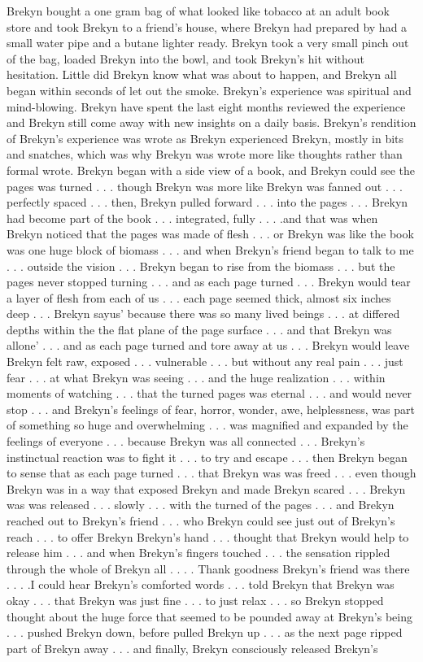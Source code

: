 \documentclass[12pt]{book}
\begin{document}
Brekyn bought a one gram bag of what looked like tobacco at an adult book store and took Brekyn to a friend's house, where Brekyn had prepared by had a small water pipe and a butane lighter ready. Brekyn took a very small pinch out of the bag, loaded Brekyn into the bowl, and took Brekyn's hit without hesitation. Little did Brekyn know what was about to happen, and Brekyn all began within seconds of let out the smoke. Brekyn's experience was spiritual and mind-blowing. Brekyn have spent the last eight months reviewed the experience and Brekyn still come away with new insights on a daily basis. Brekyn's rendition of Brekyn's experience was wrote as Brekyn experienced Brekyn, mostly in bits and snatches, which was why Brekyn was wrote more like thoughts rather than formal wrote. Brekyn began with a side view of a book, and Brekyn could see the pages was turned . . .  though Brekyn was more like Brekyn was fanned out . . .  perfectly spaced . . .  then, Brekyn pulled forward . . .  into the pages . . .  Brekyn had become part of the book . . .  integrated, fully . . .  .and that was when Brekyn noticed that the pages was made of flesh . . .  or Brekyn was like the book was one huge block of biomass . . .  and when Brekyn's friend began to talk to me . . .  outside the vision . . .  Brekyn began to rise from the biomass . . .  but the pages never stopped turning . . .  and as each page turned . . .  Brekyn would tear a layer of flesh from each of us . . .  each page seemed thick, almost six inches deep . . .  Brekyn sayus' because there was so many lived beings . . .  at differed depths within the the flat plane of the page surface . . .  and that Brekyn was allone' . . .  and as each page turned and tore away at us . . .  Brekyn would leave Brekyn felt raw, exposed . . .  vulnerable . . .  but without any real pain . . .  just fear . . .  at what Brekyn was seeing . . .  and the huge realization . . .  within moments of watching . . .  that the turned pages was eternal . . .  and would never stop . . .  and Brekyn's feelings of fear, horror, wonder, awe, helplessness, was part of something so huge and overwhelming . . .  was magnified and expanded by the feelings of everyone . . .  because Brekyn was all connected . . .  Brekyn's instinctual reaction was to fight it . . .  to try and escape . . .  then Brekyn began to sense that as each page turned . . .  that Brekyn was was freed . . .  even though Brekyn was in a way that exposed Brekyn and made Brekyn scared . . .  Brekyn was was released . . .  slowly . . .  with the turned of the pages . . .  and Brekyn reached out to Brekyn's friend . . .  who Brekyn could see just out of Brekyn's reach . . .  to offer Brekyn Brekyn's hand . . .  thought that Brekyn would help to release him . . .  and when Brekyn's fingers touched . . .  the sensation rippled through the whole of Brekyn all . . .  . Thank goodness Brekyn's friend was there . . .  .I could hear Brekyn's comforted words . . .  told Brekyn that Brekyn was okay . . .  that Brekyn was just fine . . .  to just relax . . .  so Brekyn stopped thought about the huge force that seemed to be pounded away at Brekyn's being . . .  pushed Brekyn down, before pulled Brekyn up . . .  as the next page ripped part of Brekyn away . . .  and finally, Brekyn consciously released Brekyn's 
\end{document}
